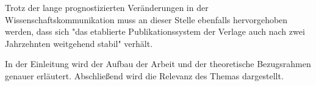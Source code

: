 Trotz der lange prognostizierten Veränderungen in der Wissenschaftskommunikation muss an dieser Stelle ebenfalls hervorgehoben werden, dass sich "das etablierte Publikationssystem der Verlage auch nach zwei Jahrzehnten weitgehend stabil"\cite{Hanekop_2014} verhält.

In der Einleitung wird der Aufbau der Arbeit und der theoretische Bezugsrahmen genauer erläutert. Abschließend wird die Relevanz des Themas dargestellt.

